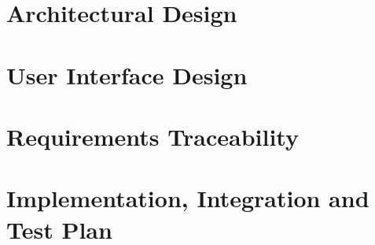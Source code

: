 \documentclass[12pt]{article}
\begin{document}
\newpage
\section{Architectural Design}



\newpage
\section{User Interface Design}


\newpage
\section{Requirements Traceability}


\newpage
\section{Implementation, Integration and Test Plan}



\newpage
\end{document}
